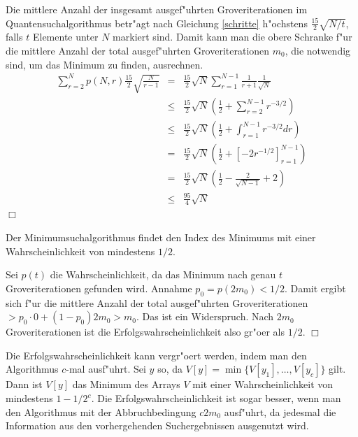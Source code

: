            Die mittlere Anzahl der insgesamt ausgef"uhrten Groveriterationen im Quantensuchalgorithmus betr"agt nach Gleichung \ref{schritte} h"ochstens $\frac{15}{2}\sqrt{N/t}$, 
           falls $t$ Elemente unter
           $N$ markiert sind. Damit kann man die obere Schranke f"ur die mittlere Anzahl der total ausgef"uhrten Groveriterationen $m_0$, die notwendig sind, um das 
           Minimum zu finden, ausrechnen.
           \begin{eqnarray*}
              \sum_{r=2}^{N}p(N,r)\frac{15}{2} \sqrt{\frac{N}{r-1}} & =   & \frac{15}{2}\sqrt{N}\sum_{r=1}^{N-1}\frac{1}{r+1} \frac{1}{\sqrt{N}} \\
                                                                    & \le & \frac{15}{2}\sqrt{N}\left(\frac{1}{2} + \sum_{r=2}^{N-1}r^{-3/2}\right) \\
                                                                    & \le & \frac{15}{2}\sqrt{N}\left(\frac{1}{2} + \int_{r=1}^{N-1}r^{-3/2} dr\right) \\
                                                                    & =   & \frac{15}{2}\sqrt{N}\left(\frac{1}{2} + \left[-2r^{-1/2}\right]_{r=1}^{N-1}\right) \\
                                                                    & =   & \frac{15}{2}\sqrt{N}\left(\frac{1}{2} - \frac{2}{\sqrt{N-1}} + 2\right) \\
                                                                    & \le & \frac{95}{4}\sqrt{N}
           \end{eqnarray*}
           \hfill $\Box$
           \begin{satz}
             Der Minimumsuchalgorithmus findet den Index des Minimums mit einer Wahrscheinlichkeit von mindestens $1/2$.
           \end{satz}
           \beweis 
             Sei $p(t)$ die Wahrscheinlichkeit, da\3 das Minimum nach genau $t$ Groveriterationen gefunden wird. Annahme $p_0 = p(2m_0) < 1/2$. Damit ergibt sich f"ur die
             mittlere Anzahl der total ausgef"uhrten Groveriterationen $> p_0 \cdot 0 + (1-p_0)2m_0 > m_0$. Das ist ein Widerspruch. Nach $2m_0$ Groveriterationen ist die
             Erfolgswahrscheinlichkeit also gr"o\3er als $1/2$. \hfill $\Box$

           Die Erfolgswahrscheinlichkeit kann vergr"o\3ert werden, indem man den Algorithmus $c$-mal ausf"uhrt. Sei $y$ so, da\3 $V[y]=\min\{V[y_1],\ldots,V[y_c]\}$ gilt.
           Dann ist $V[y]$ das Minimum des Arrays $V$ mit einer Wahrscheinlichkeit von mindestens $1-1/2^c$. Die Erfolgswahrscheinlichkeit ist sogar besser, wenn man den 
           Algorithmus mit der Abbruchbedingung $c2m_0$ ausf"uhrt, da jedesmal die Information aus den vorhergehenden Suchergebnissen ausgenutzt wird.
              
